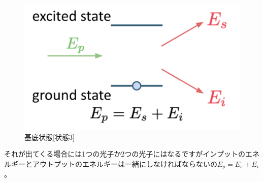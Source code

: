 \begin{figure}[H]
\begin{minipage}[b]{0.3\textwidth}
  \end{minipage}
  \hfill
  \begin{minipage}[b]{0.3\textwidth}
    \includegraphics[width=\textwidth]{lesson4/state3.pdf}
    \caption{基底状態[状態3]}
  \end{minipage}
\end{figure}

それが出てくる場合には1つの光子か2つの光子にはなるですがインプットのエネルギーとアウトプットのエネルギーは一緒にしなければならないの$E_p = E_s + E_i$。
